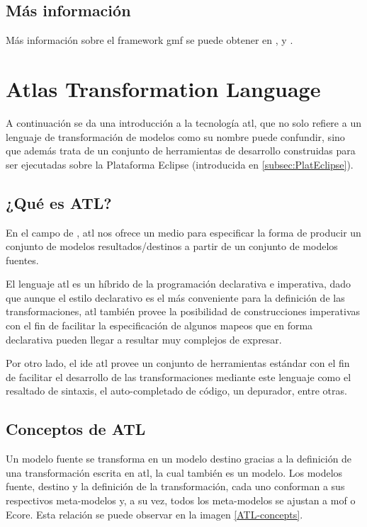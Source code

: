 \documentclass[a4paper,12pt,oneside,spanish]{book}
\begin{document}
\subsection{Más información}

Más información sobre el framework \gls{gmf} se puede obtener en \cite{GMP}, \cite{IntroGMFRuntime} y \cite{GMFTutorial}.


\section{Atlas Transformation Language}

A continuación se da una introducción a la tecnología \gls{atl}, que no solo refiere a un lenguaje de transformación de modelos como su nombre puede confundir, sino que además trata de un conjunto de herramientas de desarrollo construidas para ser ejecutadas sobre la Plataforma Eclipse (introducida en \ref{subsec:PlatEclipse}).


\subsection{¿Qué es ATL?}

En el campo de , \gls{atl} nos ofrece un medio para especificar la forma de producir un conjunto de modelos resultados/destinos a partir de un conjunto de modelos fuentes.

El lenguaje \gls{atl} es un híbrido de la programación declarativa e imperativa, dado que aunque el estilo declarativo es el más conveniente para la definición de las transformaciones, \gls{atl} también provee la posibilidad de construcciones imperativas con el fin de facilitar la especificación de algunos mapeos que en forma declarativa pueden llegar a resultar muy complejos de expresar.

Por otro lado, el \gls{ide} \gls{atl} provee un conjunto de herramientas estándar con el fin de facilitar el desarrollo de las transformaciones mediante este lenguaje como el  resaltado de sintaxis, el auto-completado de código, un depurador, entre otras.



\subsection{Conceptos de ATL}

Un modelo fuente se transforma en un modelo destino gracias a la definición de una transformación escrita en \gls{atl}, la cual también es un modelo. Los modelos fuente, destino y la definición de la transformación, cada uno conforman a sus respectivos meta-modelos y, a su vez, todos los meta-modelos se ajustan a \gls{mof} o Ecore. Esta relación se puede observar en la imagen \ref{ATL-concepts}.
\end{document}
